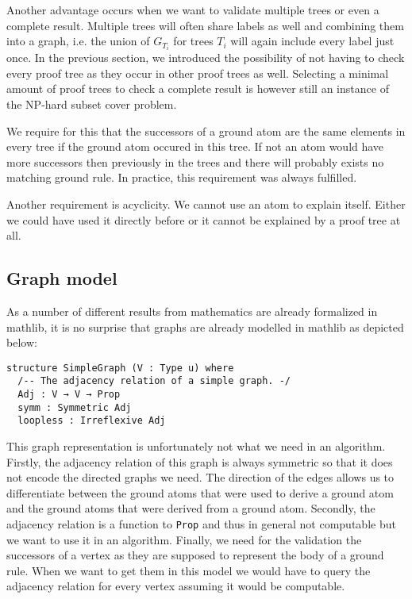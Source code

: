 Another advantage occurs when we want to validate multiple trees or even a complete result. Multiple trees will often share labels as well and combining them into a graph, i.e. the union of $G_{T_i}$ for trees $T_i$ will again include every label just once. In the previous section, we introduced the possibility of not having to check every proof tree as they occur in other proof trees as well. Selecting a minimal amount of proof trees to check a complete result is however still an instance of the NP-hard subset cover problem.

We require for this that the successors of a ground atom are the same elements in every tree if the ground atom occured in this tree. If not an atom would have more successors then previously in the trees and there will probably exists no matching ground rule. In practice, this requirement was always fulfilled.

Another requirement is acyclicity. We cannot use an atom to explain itself. Either we could have used it directly before or it cannot be explained by a proof tree at all. 
\subsection{Graph model}

As a number of different results from mathematics are already formalized in mathlib, it is no surprise that graphs are already modelled in mathlib as depicted below:

\begin{lstlisting}
structure SimpleGraph (V : Type u) where
  /-- The adjacency relation of a simple graph. -/
  Adj : V → V → Prop
  symm : Symmetric Adj 
  loopless : Irreflexive Adj
\end{lstlisting}

This graph representation is unfortunately not what we need in an algorithm. Firstly, the adjacency relation of this graph is always symmetric so that it does not encode the directed graphs we need. The direction of the edges allows us to differentiate between the ground atoms that were used to derive a ground atom and the ground atoms that were derived from a ground atom. Secondly, the adjacency relation is a function to \lstinline|Prop| and thus in general not computable but we want to use it in an algorithm. Finally, we need for the validation the successors of a vertex as they are supposed to represent the body of a ground rule. When we want to get them in this model we would have to query the adjacency relation for every vertex assuming it would be computable.

